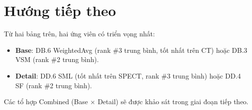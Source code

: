 \documentclass[12pt,a4paper]{article}
\begin{document}
\section{Hướng tiếp theo}

Từ hai bảng trên, hai ứng viên có triển vọng nhất:
\begin{itemize}\itemsep0pt
    \item \textbf{Base}: DB.6 WeightedAvg (rank \#3 trung bình, tốt nhất trên CT) hoặc DB.3 VSM (rank \#2 trung bình).
    \item \textbf{Detail}: DD.6 SML (tốt nhất trên SPECT, rank \#3 trung bình) hoặc DD.4 SF (rank \#2 trung bình).
\end{itemize}

Các tổ hợp Combined (Base $\times$ Detail) sẽ được khảo sát trong giai đoạn tiếp theo.
\end{document}
